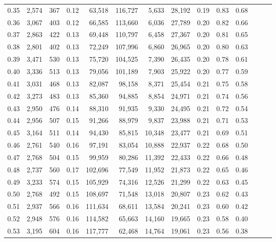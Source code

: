 \begin{tabular}{rrrrrrrrrrrrrr}
0.35 &  2,574 &  367 &  0.12 &   63,518 &  116,727 &   5,633 &  28,192 &  0.19 &  0.83 &      0.68 \\
0.36 &  3,067 &  403 &  0.12 &   66,585 &  113,660 &   6,036 &  27,789 &  0.20 &  0.82 &      0.66 \\
0.37 &  2,863 &  422 &  0.13 &   69,448 &  110,797 &   6,458 &  27,367 &  0.20 &  0.81 &      0.65 \\
0.38 &  2,801 &  402 &  0.13 &   72,249 &  107,996 &   6,860 &  26,965 &  0.20 &  0.80 &      0.63 \\
0.39 &  3,471 &  530 &  0.13 &   75,720 &  104,525 &   7,390 &  26,435 &  0.20 &  0.78 &      0.61 \\
0.40 &  3,336 &  513 &  0.13 &   79,056 &  101,189 &   7,903 &  25,922 &  0.20 &  0.77 &      0.59 \\
0.41 &  3,031 &  468 &  0.13 &   82,087 &   98,158 &   8,371 &  25,454 &  0.21 &  0.75 &      0.58 \\
0.42 &  3,273 &  483 &  0.13 &   85,360 &   94,885 &   8,854 &  24,971 &  0.21 &  0.74 &      0.56 \\
0.43 &  2,950 &  476 &  0.14 &   88,310 &   91,935 &   9,330 &  24,495 &  0.21 &  0.72 &      0.54 \\
0.44 &  2,956 &  507 &  0.15 &   91,266 &   88,979 &   9,837 &  23,988 &  0.21 &  0.71 &      0.53 \\
0.45 &  3,164 &  511 &  0.14 &   94,430 &   85,815 &  10,348 &  23,477 &  0.21 &  0.69 &      0.51 \\
0.46 &  2,761 &  540 &  0.16 &   97,191 &   83,054 &  10,888 &  22,937 &  0.22 &  0.68 &      0.50 \\
0.47 &  2,768 &  504 &  0.15 &   99,959 &   80,286 &  11,392 &  22,433 &  0.22 &  0.66 &      0.48 \\
0.48 &  2,737 &  560 &  0.17 &  102,696 &   77,549 &  11,952 &  21,873 &  0.22 &  0.65 &      0.46 \\
0.49 &  3,233 &  574 &  0.15 &  105,929 &   74,316 &  12,526 &  21,299 &  0.22 &  0.63 &      0.45 \\
0.50 &  2,768 &  492 &  0.15 &  108,697 &   71,548 &  13,018 &  20,807 &  0.23 &  0.62 &      0.43 \\
0.51 &  2,937 &  566 &  0.16 &  111,634 &   68,611 &  13,584 &  20,241 &  0.23 &  0.60 &      0.42 \\
0.52 &  2,948 &  576 &  0.16 &  114,582 &   65,663 &  14,160 &  19,665 &  0.23 &  0.58 &      0.40 \\
0.53 &  3,195 &  604 &  0.16 &  117,777 &   62,468 &  14,764 &  19,061 &  0.23 &  0.56 &      0.38 \\

\end{tabular}
